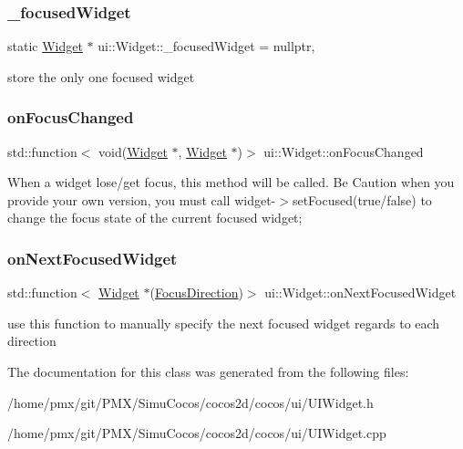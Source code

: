 \subsubsection{\texorpdfstring{\+\_\+focused\+Widget}{\_focusedWidget}}
{\footnotesize\ttfamily static \hyperlink{classui_1_1Widget}{Widget} $\ast$ ui\+::\+Widget\+::\+\_\+focused\+Widget = nullptr\hspace{0.3cm}{\ttfamily [static]}, {\ttfamily [protected]}}

store the only one focused widget \mbox{\label{classui_1_1Widget_a3e2ceb053bc91747ea2f175cd77e784b}} 
\subsubsection{\texorpdfstring{on\+Focus\+Changed}{onFocusChanged}}
{\footnotesize\ttfamily std\+::function$<$ void(\hyperlink{classui_1_1Widget}{Widget} $\ast$, \hyperlink{classui_1_1Widget}{Widget} $\ast$)$>$ ui\+::\+Widget\+::on\+Focus\+Changed}

When a widget lose/get focus, this method will be called. Be Caution when you provide your own version, you must call widget-\/$>$set\+Focused(true/false) to change the focus state of the current focused widget; \mbox{\label{classui_1_1Widget_ac298bf6d67ef13843b798acf238ff8aa}} 
\subsubsection{\texorpdfstring{on\+Next\+Focused\+Widget}{onNextFocusedWidget}}
{\footnotesize\ttfamily std\+::function$<$ \hyperlink{classui_1_1Widget}{Widget} $\ast$(\hyperlink{classui_1_1Widget_a8ae8e8fc793a04a87584205cd1e8a8a5}{Focus\+Direction})$>$ ui\+::\+Widget\+::on\+Next\+Focused\+Widget}

use this function to manually specify the next focused widget regards to each direction 

The documentation for this class was generated from the following files\+:\begin{DoxyCompactItemize}
\item 
/home/pmx/git/\+P\+M\+X/\+Simu\+Cocos/cocos2d/cocos/ui/U\+I\+Widget.\+h\item 
/home/pmx/git/\+P\+M\+X/\+Simu\+Cocos/cocos2d/cocos/ui/U\+I\+Widget.\+cpp\end{DoxyCompactItemize}
